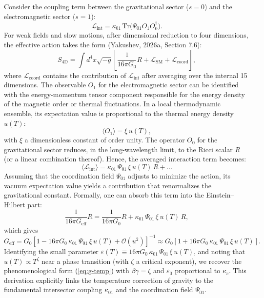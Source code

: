 \documentclass[12pt]{article}
\theoremstyle{remark}
\newcommand{\eps}{\varepsilon}
\newcommand{\kappac}{\kappa_c}
\newcommand{\lagr}{\mathcal{L}}
\begin{document}
	Consider the coupling term between the gravitational sector ($s=0$) and the electromagnetic sector ($s=1$):
	\begin{equation}
		\lagr_{\text{int}} = \kappa_{01} \, \mathrm{Tr}\big(\Psi_{01} O_1 O_0^\dagger\big).
	\end{equation}
	For weak fields and slow motions, after dimensional reduction to four dimensions, the effective action takes the form (Yakushev, 2026a, Section 7.6):
	\begin{equation}
		S_{\text{4D}} = \int d^4x \sqrt{-g} \left[ \frac{1}{16\pi G_0} R + \mathcal{L}_{\text{SM}} + \mathcal{L}_{\text{coord}} \right],
	\end{equation}
	where $\mathcal{L}_{\text{coord}}$ contains the contribution of $\lagr_{\text{int}}$ after averaging over the internal 15 dimensions. The observable $O_1$ for the electromagnetic sector can be identified with the energy-momentum tensor component responsible for the energy density of the magnetic order or thermal fluctuations. In a local thermodynamic ensemble, its expectation value is proportional to the thermal energy density $u(T)$:
	\begin{equation}
		\langle O_1 \rangle = \xi \, u(T),
	\end{equation}
	with $\xi$ a dimensionless constant of order unity. The operator $O_0$ for the gravitational sector reduces, in the long-wavelength limit, to the Ricci scalar $R$ (or a linear combination thereof). Hence, the averaged interaction term becomes:
	\begin{equation}
		\langle \lagr_{\text{int}} \rangle = \kappa_{01} \, \Psi_{01} \, \xi \, u(T) \, R + \dots
	\end{equation}
	Assuming that the coordination field $\Psi_{01}$ adjusts to minimize the action, its vacuum expectation value yields a contribution that renormalizes the gravitational constant. Formally, one can absorb this term into the Einstein–Hilbert part:
	\begin{equation}
		\frac{1}{16\pi G_{\text{eff}}} R = \frac{1}{16\pi G_0} R + \kappa_{01} \, \Psi_{01} \, \xi \, u(T) \, R,
	\end{equation}
	which gives
	\begin{equation}
		G_{\text{eff}} = G_0 \left[ 1 - 16\pi G_0 \, \kappa_{01} \, \Psi_{01} \, \xi \, u(T) + \mathcal{O}(u^2) \right]^{-1} \approx G_0 \left[ 1 + 16\pi G_0 \, \kappa_{01} \, \Psi_{01} \, \xi \, u(T) \right].
	\end{equation}
	Identifying the small parameter $\eps(T) \equiv 16\pi G_0 \, \kappa_{01} \, \Psi_{01} \, \xi \, u(T)$, and noting that $u(T) \propto T^{\zeta}$ near a phase transition (with $\zeta$ a critical exponent), we recover the phenomenological form (\ref{eq:g-temp}) with $\beta\gamma = \zeta$ and $\eps_0$ proportional to $\kappac$. This derivation explicitly links the temperature correction of gravity to the fundamental intersector coupling $\kappa_{01}$ and the coordination field $\Psi_{01}$.
	
\end{document}
